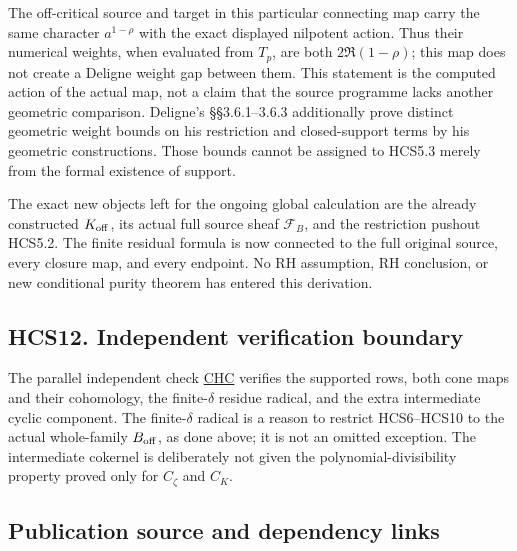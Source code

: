 The off-critical source and target in this particular connecting map
carry the same character \(a^{1-\rho}\) with the exact displayed
nilpotent action. Thus their numerical weights, when evaluated from
\(T_p\), are both \(2\Re(1-\rho)\); this map does not create a Deligne
weight gap between them. This statement is the computed action of the
actual map, not a claim that the source programme lacks another
geometric comparison. Deligne's §§3.6.1--3.6.3 additionally prove
distinct geometric weight bounds on his restriction and closed-support
terms by his geometric constructions. Those bounds cannot be assigned to
HCS5.3 merely from the formal existence of support.

The exact new objects left for the ongoing global calculation are the
already constructed \(K_{\rm off}\), its actual full source sheaf
\(\mathcal F_B\), and the restriction pushout HCS5.2. The finite
residual formula is now connected to the full original source, every
closure map, and every endpoint. No RH assumption, RH conclusion, or new
conditional purity theorem has entered this derivation.

\subsection{HCS12. Independent verification
boundary}\label{hcs12.-independent-verification-boundary}

The parallel independent check
\href{https://github.com/KokunoYumeto/zeta-function-research-reader/blob/main/workbenches/splitzero-tandem/continuations/20260925-full-source-tensor-and-original-divisor/counterfactual/HILBERT_CLOSURE_SUPPORT_INDEPENDENT_CHECK.md}{CHC}
verifies the supported rows, both cone maps and their cohomology, the
finite-\(\delta\) residue radical, and the extra intermediate cyclic
component. The finite-\(\delta\) radical is a reason to restrict
HCS6--HCS10 to the actual whole-family \(B_{\rm off}\), as done above;
it is not an omitted exception. The intermediate cokernel is
deliberately not given the polynomial-divisibility property proved only
for \(C_\zeta\) and \(C_K\).

\subsection{Publication source and dependency
links}\label{publication-source-and-dependency-links}

